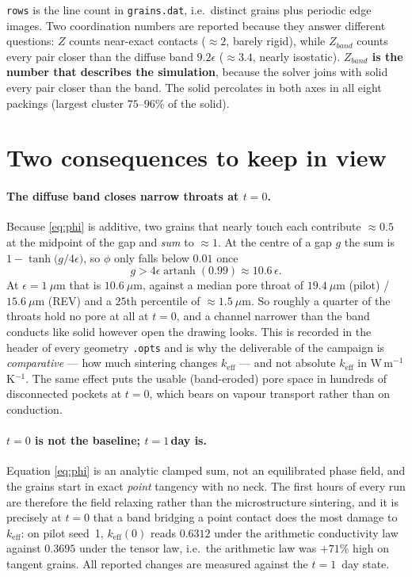 \documentclass[11pt]{article}
\newcommand{\code}[1]{\texttt{\small #1}}
\begin{document}
\noindent
\code{rows} is the line count in \code{grains.dat}, i.e.\ distinct grains
plus periodic edge images. Two coordination numbers are reported because
they answer different questions: $Z$ counts near-exact contacts
($\approx 2$, barely rigid), while $Z_{band}$ counts every pair closer than
the diffuse band $9.2\epsilon$ ($\approx 3.4$, nearly isostatic).
\textbf{$Z_{band}$ is the number that describes the simulation}, because
the solver joins with solid every pair closer than the band. The solid
percolates in both axes in all eight packings (largest cluster
$75$--$96\%$ of the solid).

\section{Two consequences to keep in view}

\paragraph{The diffuse band closes narrow throats at $t=0$.}
Because \eqref{eq:phi} is additive, two grains that nearly touch each
contribute $\approx 0.5$ at the midpoint of the gap and \emph{sum} to
$\approx 1$. At the centre of a gap $g$ the sum is
$1 - \tanh\!\big(g/4\epsilon\big)$, so $\phi$ only falls below $0.01$ once
%
\begin{equation}
  g > 4\epsilon \operatorname{artanh}(0.99) \approx 10.6\,\epsilon .
\end{equation}
%
At $\epsilon = 1\ \mu$m that is $10.6\ \mu$m, against a median pore throat
of $19.4\ \mu$m (pilot) / $15.6\ \mu$m (REV) and a $25$th percentile of
$\approx 1.5\ \mu$m. So roughly a quarter of the throats hold no pore at
all at $t=0$, and a channel narrower than the band conducts like solid
however open the drawing looks. This is recorded in the header of every
geometry \code{.opts} and is why the deliverable of the campaign is
\emph{comparative} --- how much sintering changes $k_{\text{eff}}$ --- and
not absolute $k_{\text{eff}}$ in W\,m$^{-1}$\,K$^{-1}$. The same effect
puts the usable (band-eroded) pore space in hundreds of disconnected
pockets at $t=0$, which bears on vapour transport rather than on
conduction.

\paragraph{$t=0$ is not the baseline; $t=1$\,day is.}
Equation \eqref{eq:phi} is an analytic clamped sum, not an equilibrated
phase field, and the grains start in exact \emph{point} tangency with no
neck. The first hours of every run are therefore the field relaxing rather
than the microstructure sintering, and it is precisely at $t=0$ that a band
bridging a point contact does the most damage to $k_{\text{eff}}$: on pilot
seed~1, $k_{\text{eff}}(0)$ reads $0.6312$ under the arithmetic
conductivity law against $0.3695$ under the tensor law, i.e.\ the
arithmetic law was $+71\%$ high on tangent grains. All reported changes are
measured against the $t = 1$~day state.
\end{document}

